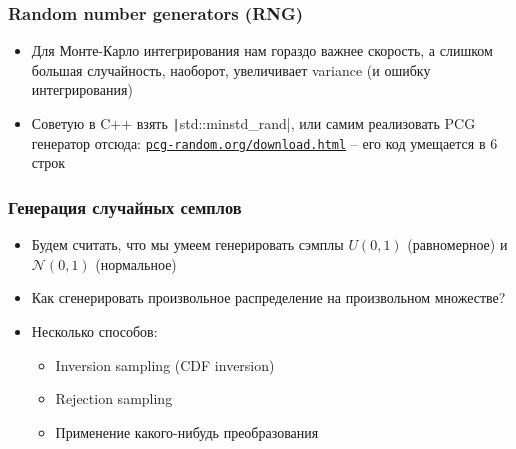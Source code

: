 \documentclass[handout,10pt]{beamer}
\begin{document}
\begin{frame}[fragile]
\frametitle{Random number generators (RNG)}
\begin{itemize}
\item Для Монте-Карло интегрирования нам гораздо важнее скорость, а слишком большая случайность, наоборот, увеличивает variance (и ошибку интегрирования)
\pause
\item Советую в C++ взять \texttt|std::minstd_rand|, или самим реализовать PCG генератор отсюда: \href{https://www.pcg-random.org/download.html}{\texttt{pcg-random.org/download.html}} -- его код умещается в 6 строк
\end{itemize}
\end{frame}

\begin{frame}[fragile]
\frametitle{Генерация случайных семплов}
\begin{itemize}
\item Будем считать, что мы умеем генерировать сэмплы \begin{math}U(0,1)\end{math} (равномерное) и \begin{math}\mathcal{N}(0,1)\end{math} (нормальное)
\pause
\item Как сгенерировать произвольное распределение на произвольном множестве?
\pause
\item Несколько способов:
\pause
\begin{itemize}
\item Inversion sampling (CDF inversion)
\item Rejection sampling
\item Применение какого-нибудь преобразования
\end{itemize}
\end{itemize}
\end{frame}
\end{document}
